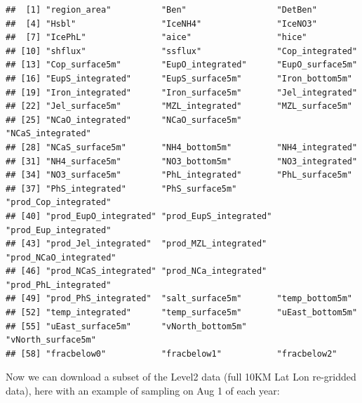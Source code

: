 \documentclass[
]{article}
\begin{document}
\begin{verbatim}
##  [1] "region_area"          "Ben"                  "DetBen"              
##  [4] "Hsbl"                 "IceNH4"               "IceNO3"              
##  [7] "IcePhL"               "aice"                 "hice"                
## [10] "shflux"               "ssflux"               "Cop_integrated"      
## [13] "Cop_surface5m"        "EupO_integrated"      "EupO_surface5m"      
## [16] "EupS_integrated"      "EupS_surface5m"       "Iron_bottom5m"       
## [19] "Iron_integrated"      "Iron_surface5m"       "Jel_integrated"      
## [22] "Jel_surface5m"        "MZL_integrated"       "MZL_surface5m"       
## [25] "NCaO_integrated"      "NCaO_surface5m"       "NCaS_integrated"     
## [28] "NCaS_surface5m"       "NH4_bottom5m"         "NH4_integrated"      
## [31] "NH4_surface5m"        "NO3_bottom5m"         "NO3_integrated"      
## [34] "NO3_surface5m"        "PhL_integrated"       "PhL_surface5m"       
## [37] "PhS_integrated"       "PhS_surface5m"        "prod_Cop_integrated" 
## [40] "prod_EupO_integrated" "prod_EupS_integrated" "prod_Eup_integrated" 
## [43] "prod_Jel_integrated"  "prod_MZL_integrated"  "prod_NCaO_integrated"
## [46] "prod_NCaS_integrated" "prod_NCa_integrated"  "prod_PhL_integrated" 
## [49] "prod_PhS_integrated"  "salt_surface5m"       "temp_bottom5m"       
## [52] "temp_integrated"      "temp_surface5m"       "uEast_bottom5m"      
## [55] "uEast_surface5m"      "vNorth_bottom5m"      "vNorth_surface5m"    
## [58] "fracbelow0"           "fracbelow1"           "fracbelow2"
\end{verbatim}

Now we can download a subset of the Level2 data (full 10KM Lat Lon
re-gridded data), here with an example of sampling on Aug 1 of each
year:
\end{document}
